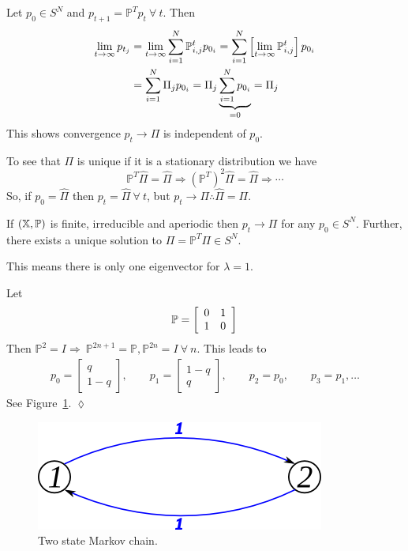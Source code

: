 Let $p_0\in S^N$ and $p_{t+1}=\mathbb{P}^T p_t~\forall~t$.
Then
\begin{align*}
\lim_{t\to\infty}p_{t_j} &= \lim_{t\to\infty}\sum_{i=1}^N\mathbb{P}_{i,j}^t p_{0_i} = \sum_{i=1}^N\left[\lim_{t\to\infty}\mathbb{P}_{i,j}^t\right]p_{0_i} \\
&= \sum_{i=1}^N\Pi_j p_{0_i} = \Pi_j\underbrace{\sum_{i=1}^N p_{0_i}}_{=0} = \Pi_j
\end{align*}
This shows convergence $p_t\rightarrow\Pi$ is independent of $p_0$.

To see that $\Pi$ is unique if it is a stationary distribution we have
$$\mathbb{P}^T\hat{\Pi} = \hat{\Pi} \Rightarrow {(\mathbb{P}^T)}^2\hat{\Pi} = \hat{\Pi} \Rightarrow \cdots$$
So, if $p_0=\hat{\Pi}$ then $p_t=\hat{\Pi}~\forall~t$, but $p_t\rightarrow\Pi \therefore \hat{\Pi}=\Pi$.

\begin{corollary}
If $(\mathbb{X},\mathbb{P})$ is finite, irreducible and aperiodic then $p_t\rightarrow\Pi$ for any $p_0\in S^N$.
Further, there exists a unique solution to $\Pi=\mathbb{P}^T\Pi \in S^N$.
\end{corollary}
This means there is only one eigenvector for $\lambda=1$.

\begin{example}
Let
$$\mathbb{P} = \left[\begin{array}{c c} 0 & 1 \\ 1 & 0 \end{array}\right]$$
Then $\mathbb{P}^2=I \Rightarrow~\mathbb{P}^{2n+1}=\mathbb{P}, \mathbb{P}^{2n}=I~\forall~n$.
This leads to
\begin{align*}
p_0 = \left[\begin{array}{c} q \\ 1-q \end{array}\right],
\qquad p_1 = \left[\begin{array}{c} 1-q \\ q \end{array}\right],
\qquad p_2 = p_0,
\qquad p_3=p_1,\ldots
\end{align*}
See Figure~\ref{fig:10mc2}.
$\lozenge$
\end{example}

\begin{figure}[ht!]
\centering
\includegraphics[width=.4\textwidth]{images/10mc2}
\caption{Two state Markov chain.}
\label{fig:10mc2}
\end{figure}

